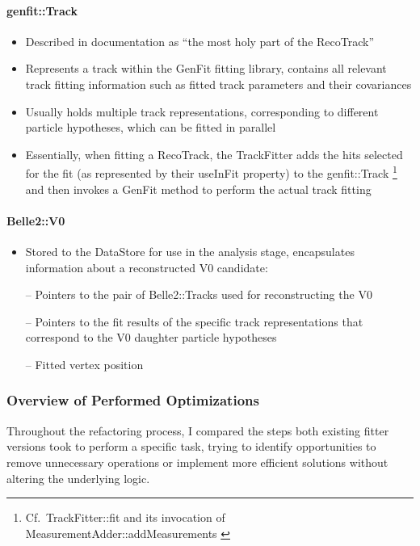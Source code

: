 \paragraph{genfit::Track}
\begin{itemize}[topsep=0pt]
  \item Described in documentation as \enquote{the most holy part of the RecoTrack}
  \item Represents a track within the GenFit fitting library, contains all relevant track fitting information such as fitted track parameters and their covariances
  \item Usually holds multiple track representations, corresponding to different particle hypotheses, which can be fitted in parallel
  \item Essentially, when fitting a RecoTrack, the TrackFitter adds the hits selected for the fit (as represented by their useInFit property) to the genfit::Track%
  \footnote{%
    Cf.\ TrackFitter::fit and its invocation of MeasurementAdder::addMeasurements \cite{trackfitter-fit-doxygen}
  }
  and then invokes a GenFit method to perform the actual track fitting
\end{itemize}

\paragraph{Belle2::V0}
\begin{itemize}[topsep=0pt]
  \item Stored to the DataStore for use in the analysis stage, encapsulates information about a reconstructed V0 candidate:
  \item[--] Pointers to the pair of Belle2::Tracks used for reconstructing the V0
  \item[--] Pointers to the fit results of the specific track representations that correspond to the V0 daughter particle hypotheses
  \item[--] Fitted vertex position
\end{itemize}

\subsubsection{Overview of Performed Optimizations}

Throughout the refactoring process, I compared the steps both existing fitter versions took to perform a specific task, trying to identify opportunities to remove unnecessary operations or implement more efficient solutions without altering the underlying logic.

